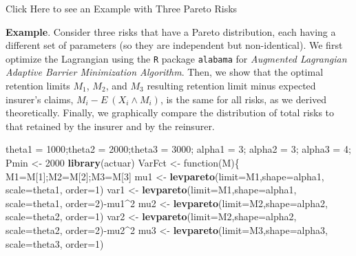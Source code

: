 \documentclass[]{book}
\newenvironment{Shaded}{\begin{snugshade}}{\end{snugshade}}
\newcommand{\KeywordTok}[1]{\textcolor[rgb]{0.13,0.29,0.53}{\textbf{{#1}}}}
\newcommand{\DataTypeTok}[1]{\textcolor[rgb]{0.13,0.29,0.53}{{#1}}}
\newcommand{\DecValTok}[1]{\textcolor[rgb]{0.00,0.00,0.81}{{#1}}}
\newcommand{\StringTok}[1]{\textcolor[rgb]{0.31,0.60,0.02}{{#1}}}
\newcommand{\NormalTok}[1]{{#1}}
\theoremstyle{definition}
\theoremstyle{definition}
\theoremstyle{definition}
\theoremstyle{remark}
\begin{document}
Click Here to see an Example with Three Pareto Risks

\hypertarget{toggleParetoRisksExcess}{}
\textbf{Example}. Consider three risks that have a Pareto distribution,
each having a different set of parameters (so they are independent but
non-identical). We first optimize the Lagrangian using the \texttt{R}
package \texttt{alabama} for \emph{Augmented Lagrangian Adaptive Barrier
Minimization Algorithm}. Then, we show that the optimal retention limits
\(M_1\), \(M_2\), and \(M_3\) resulting retention limit minus expected
insurer's claims, \(M_i - E ~(X_i \wedge M_i)\), is the same for all
risks, as we derived theoretically. Finally, we graphically compare the
distribution of total risks to that retained by the insurer and by the
reinsurer.

\begin{Shaded}
\begin{Highlighting}[]
\NormalTok{theta1 =}\StringTok{ }\DecValTok{1000}\NormalTok{;theta2 =}\StringTok{ }\DecValTok{2000}\NormalTok{;theta3 =}\StringTok{ }\DecValTok{3000}\NormalTok{;}
\NormalTok{alpha1 =}\StringTok{ }\DecValTok{3}\NormalTok{;   alpha2 =}\StringTok{ }\DecValTok{3}\NormalTok{;   alpha3 =}\StringTok{ }\DecValTok{4}\NormalTok{;}
\NormalTok{Pmin <-}\StringTok{ }\DecValTok{2000}
\KeywordTok{library}\NormalTok{(actuar)}
\NormalTok{VarFct <-}\StringTok{ }\NormalTok{function(M)\{}
  \NormalTok{M1=M[}\DecValTok{1}\NormalTok{];M2=M[}\DecValTok{2}\NormalTok{];M3=M[}\DecValTok{3}\NormalTok{]}
  \NormalTok{mu1    <-}\StringTok{ }\KeywordTok{levpareto}\NormalTok{(}\DataTypeTok{limit=}\NormalTok{M1,}\DataTypeTok{shape=}\NormalTok{alpha1, }\DataTypeTok{scale=}\NormalTok{theta1, }\DataTypeTok{order=}\DecValTok{1}\NormalTok{)}
  \NormalTok{var1   <-}\StringTok{ }\KeywordTok{levpareto}\NormalTok{(}\DataTypeTok{limit=}\NormalTok{M1,}\DataTypeTok{shape=}\NormalTok{alpha1, }\DataTypeTok{scale=}\NormalTok{theta1, }\DataTypeTok{order=}\DecValTok{2}\NormalTok{)-mu1^}\DecValTok{2}
  \NormalTok{mu2    <-}\StringTok{ }\KeywordTok{levpareto}\NormalTok{(}\DataTypeTok{limit=}\NormalTok{M2,}\DataTypeTok{shape=}\NormalTok{alpha2, }\DataTypeTok{scale=}\NormalTok{theta2, }\DataTypeTok{order=}\DecValTok{1}\NormalTok{)}
  \NormalTok{var2   <-}\StringTok{ }\KeywordTok{levpareto}\NormalTok{(}\DataTypeTok{limit=}\NormalTok{M2,}\DataTypeTok{shape=}\NormalTok{alpha2, }\DataTypeTok{scale=}\NormalTok{theta2, }\DataTypeTok{order=}\DecValTok{2}\NormalTok{)-mu2^}\DecValTok{2}
  \NormalTok{mu3    <-}\StringTok{ }\KeywordTok{levpareto}\NormalTok{(}\DataTypeTok{limit=}\NormalTok{M3,}\DataTypeTok{shape=}\NormalTok{alpha3, }\DataTypeTok{scale=}\NormalTok{theta3, }\DataTypeTok{order=}\DecValTok{1}\NormalTok{)}

\end{Highlighting}
\end{Shaded}
\end{document}
